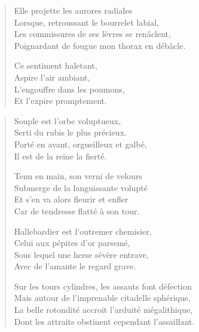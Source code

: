 \begin{verse}
Elle projette les aurores radiales\\
Lorsque, retroussant le bourrelet labial,\\
Les commissures de ses lèvres se renâclent,\\
Poignardant de fougue mon thorax en débâcle.

Ce sentiment haletant,\\
Aspire l’air ambiant,\\
L’engouffre dans les poumons,\\
Et l’expire promptement.

\end{verse}

\begin{verse}
Souple est l’orbe voluptueux,\\
Serti du rubis le plus précieux.\\
Porté en avant, orgueilleux et galbé,\\
Il est de la reine la fierté.

Tenu en main, son verni de velours\\
Submerge de la languissante volupté\\
Et s’en va alors fleurir et enfler\\
Car de tendresse flatté à son tour.

Hallebardier est l’outremer chemisier,\\
Celui aux pépites d’or parsemé,\\
Sous lequel une herse sévère entrave,\\
Avec de l’amante le regard grave.

Sur les tours cylindres, les assauts font défection\\
Mais autour de l’imprenable citadelle sphérique,\\
La belle rotondité accroit l’arduité mégalithique,\\
Dont les attraits obstinent cependant l’assaillant.
\end{verse}


